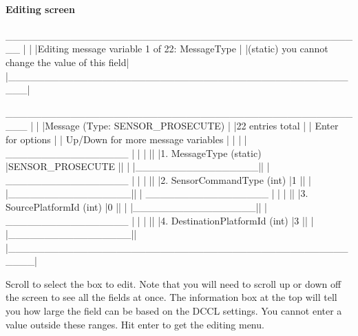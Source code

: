 \documentclass[11pt, letterpaper, oneside]{memoir}
\begin{document}
\paragraph{Editing screen}
\begin{boxedverbatim}

    __________________________________________________
   |                                                  |
   |Editing message variable 1 of 22: MessageType     |
   |(static) you cannot change the value of this field|
   |__________________________________________________|

   ___________________________________________________
  |                                                   | 
  |Message (Type: SENSOR_PROSECUTE)                   |
  |22 entries total                                   |
  |        {Enter} for options                        |
  |        {Up/Down} for more message variables       |
  |                                                   |
  |                                 _________________ |
  |                                |                 ||
  |1. MessageType (static)         |SENSOR_PROSECUTE ||
  |                                |_________________||
  |                                 _________________ |
  |                                |                 ||
  |2. SensorCommandType (int)      |1                ||
  |                                |_________________||
  |                                 _________________ |
  |                                |                 || 
  |3. SourcePlatformId (int)       |0                ||
  |                                |_________________||
  |                                 _________________ |
  |                                |                 ||
  |4. DestinationPlatformId (int)  |3                ||
  |                                |_________________||
  |___________________________________________________|
\end{boxedverbatim}
\resetbvlinenumber

Scroll to select the box to edit. Note that you will need to scroll up or down off the screen to see all the fields at once. The information box at the top will tell you how large the field can be based on the DCCL settings. You cannot enter a value outside these ranges. Hit enter to get the editing menu.
\end{document}
